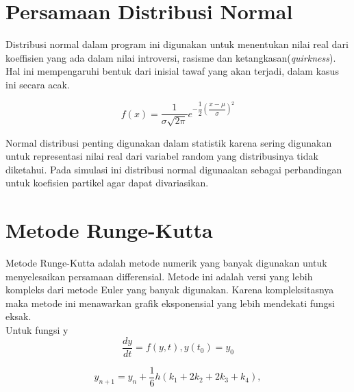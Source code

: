 \section{Persamaan Distribusi Normal }\label{cha:modelpartikel}
\hspace{0.5cm} Distribusi normal dalam program ini digunakan untuk menentukan nilai real dari koeffisien yang ada dalam nilai introversi, rasisme dan ketangkasan(\emph{quirkness}). Hal ini mempengaruhi bentuk dari inisial tawaf yang akan terjadi, dalam kasus ini secara acak. 

\begin{equation}
f(x) =\dfrac{1}{\sigma \sqrt{2 \pi}} e^{-\dfrac{1}{2}(\dfrac{x-\mu}{\sigma})^2}
\end{equation}

\hspace{0.5cm} Normal distribusi penting digunakan dalam statistik karena sering digunakan untuk representasi nilai real dari variabel random yang distribusinya tidak diketahui\citep{Caseberg2009}. Pada simulasi ini distribusi normal digunaakan sebagai perbandingan untuk koefisien  partikel  agar dapat divariasikan.





\section{Metode Runge-Kutta}\label{cha:metode perhitungan}
\hspace{0.5cm} Metode Runge-Kutta adalah metode numerik yang banyak digunakan untuk menyelesaikan persamaan differensial. Metode ini adalah versi yang lebih kompleks dari metode Euler yang banyak digunakan. Karena kompleksitasnya maka metode ini menawarkan grafik eksponensial yang lebih mendekati fungsi eksak.\\
Untuk fungsi y
\begin{equation}
\dfrac{dy}{dt} =f(y,t) , y(t_0)=y_0
\end{equation}

\begin{equation}
y_{n+1} = y_{n} + \dfrac{1}{6}h (k_1+2k_2+2k_3+k_4),
\end{equation}

